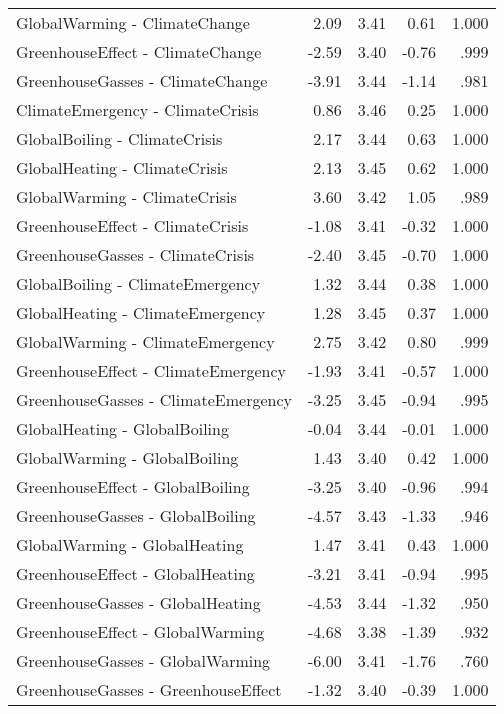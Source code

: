 \begin{table}[ht]
\begin{tabular}{lrrrr}
  GlobalWarming - ClimateChange & 2.09 & 3.41 & 0.61 & 1.000 \\ 
  GreenhouseEffect - ClimateChange & -2.59 & 3.40 & -0.76 & .999 \\ 
  GreenhouseGasses - ClimateChange & -3.91 & 3.44 & -1.14 & .981 \\ 
  ClimateEmergency - ClimateCrisis & 0.86 & 3.46 & 0.25 & 1.000 \\ 
  GlobalBoiling - ClimateCrisis & 2.17 & 3.44 & 0.63 & 1.000 \\ 
  GlobalHeating - ClimateCrisis & 2.13 & 3.45 & 0.62 & 1.000 \\ 
  GlobalWarming - ClimateCrisis & 3.60 & 3.42 & 1.05 & .989 \\ 
  GreenhouseEffect - ClimateCrisis & -1.08 & 3.41 & -0.32 & 1.000 \\ 
  GreenhouseGasses - ClimateCrisis & -2.40 & 3.45 & -0.70 & 1.000 \\ 
  GlobalBoiling - ClimateEmergency & 1.32 & 3.44 & 0.38 & 1.000 \\ 
  GlobalHeating - ClimateEmergency & 1.28 & 3.45 & 0.37 & 1.000 \\ 
  GlobalWarming - ClimateEmergency & 2.75 & 3.42 & 0.80 & .999 \\ 
  GreenhouseEffect - ClimateEmergency & -1.93 & 3.41 & -0.57 & 1.000 \\ 
  GreenhouseGasses - ClimateEmergency & -3.25 & 3.45 & -0.94 & .995 \\ 
  GlobalHeating - GlobalBoiling & -0.04 & 3.44 & -0.01 & 1.000 \\ 
  GlobalWarming - GlobalBoiling & 1.43 & 3.40 & 0.42 & 1.000 \\ 
  GreenhouseEffect - GlobalBoiling & -3.25 & 3.40 & -0.96 & .994 \\ 
  GreenhouseGasses - GlobalBoiling & -4.57 & 3.43 & -1.33 & .946 \\ 
  GlobalWarming - GlobalHeating & 1.47 & 3.41 & 0.43 & 1.000 \\ 
  GreenhouseEffect - GlobalHeating & -3.21 & 3.41 & -0.94 & .995 \\ 
  GreenhouseGasses - GlobalHeating & -4.53 & 3.44 & -1.32 & .950 \\ 
  GreenhouseEffect - GlobalWarming & -4.68 & 3.38 & -1.39 & .932 \\ 
  GreenhouseGasses - GlobalWarming & -6.00 & 3.41 & -1.76 & .760 \\ 
  GreenhouseGasses - GreenhouseEffect & -1.32 & 3.40 & -0.39 & 1.000 \\ 
   \hline
\end{tabular}
\end{table}
